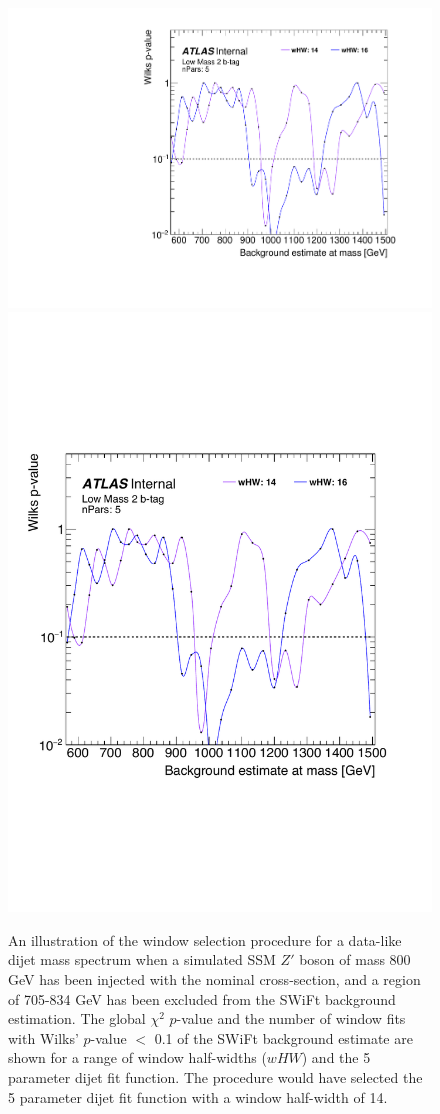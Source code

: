 \begin{figure}[!htb]
\captionsetup[subfigure]{aboveskip=0pt,justification=centering}
\centering
{} {
  \includegraphics[width=0.49\linewidth, angle=0,page=6]{figs/Dibjet/LowMass/FitStudy_min566/windowSel_corrFitCR_dataLike_v11_Zprimebb800_xsFactor1_removeWindow.pdf}
}\hspace{-8mm}
 {
  \includegraphics[width=0.44\linewidth, angle=0,page=8]{figs/Dibjet/LowMass/FitStudy_min566/windowSel_corrFitCR_dataLike_v11_Zprimebb800_xsFactor1_removeWindow_edited.pdf}
}
\caption[An illustration of the window selection procedure for a data-like dijet mass spectrum when
          a simulated SSM $Z'$ boson of mass 800 GeV has been injected
          and a region of 705-834 GeV has been excluded from the SWiFt background estimation.]
        {\label{fig:windowSel_Zprimebb800_xsFactor1}
          An illustration of the window selection procedure for a data-like dijet mass spectrum when
          a simulated SSM $Z'$ boson of mass 800 GeV has been injected with the nominal cross-section,
          and a region of 705-834 GeV has been excluded from the SWiFt background estimation.
          The global $\chi^{2}$ \mbox{$p$-value} %
          and the number of window fits with Wilks' \mbox{$p$-value} $<$ 0.1 of the SWiFt background estimate are shown
          for a range of window half-widths ($wHW$) and the 5 parameter dijet fit function.
          The procedure would have selected the 5 parameter dijet fit function with a window half-width of 14.
}
\end{figure}

